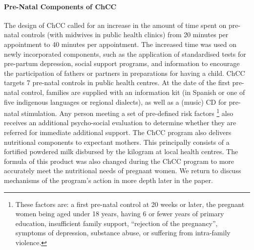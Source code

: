 \documentclass[12pt]{article}
\begin{document}
\begin{spacing}{1.4}
\paragraph{Pre-Natal Components of ChCC} The design of ChCC called for
an increase in the amount of time spent on pre-natal controls (with
midwives in public health clinics) from 20 minutes per appointment to
40 minutes per appointment.  The increased time was used on newly
incorporated components, such as the application of standardised
tests for pre-partum depression, social support programs, and information
to encourage the participation of fathers or partners in preparations
for having a child.  ChCC targets 7 pre-natal controls in public
health centres.  At the date of the first pre-natal control, families are
supplied with an information kit (in Spanish or one of five indigenous
languages or regional dialects), as well as a (music) CD for pre-natal
stimulation.  Any person meeting a set of pre-defined risk factors%
\footnote{These factors are: a first pre-natal control at 20 weeks or
  later, the pregnant women being aged under 18 years, having 6 or
  fewer years of primary education, insufficient family support,
  ``rejection of the pregnancy'', symptoms of depression, substance
abuse, or suffering from intra-family violence.} also
receives an additional psycho-social evaluation to determine whether
they are referred for immediate additional support.  The ChCC program
also delivers nutritional components to expectant mothers.  This
principally consists of a fortified powdered milk disbursed by the
kilogram at local health centres.  The formula of this product was
also changed during the ChCC program to more accurately meet the
nutritional needs of pregnant women. We return to discuss mechanisms
of the program's action in more depth later in the paper.


\end{spacing}
\end{document}
